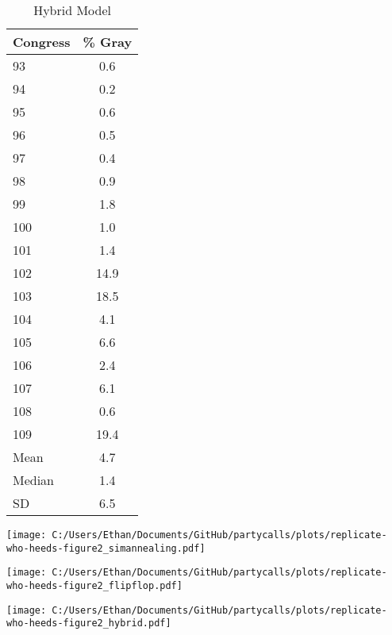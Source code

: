 \documentclass[12pt]{article}
\begin{document}
	\begin{table}[!htbp]
		\begin{center}
			\caption{Hybrid Model}
			\begin{tabular}[!hb]{lc}
				\hline
				Congress &  \% Gray  \\
				\hline
				93 & 0.6 \\ 
				94 & 0.2 \\ 
				95 & 0.6 \\ 
				96 & 0.5 \\ 
			    97 & 0.4 \\ 
				98 & 0.9 \\ 
				99 & 1.8 \\ 
				100 & 1.0 \\ 
				101 & 1.4 \\ 
				102 & 14.9 \\ 
				103 & 18.5 \\ 
				104 & 4.1 \\ 
				105 & 6.6 \\ 
				106 & 2.4 \\ 
				107 & 6.1 \\ 
				108 & 0.6 \\ 
				109 & 19.4 \\ 
				\hline
				Mean & 4.7 \\
				Median & 1.4 \\
				SD & 6.5 \\
				\hline
			\end{tabular}
		\end{center}
	\end{table}
	
	
	
\texttt{[image: C:/Users/Ethan/Documents/GitHub/partycalls/plots/replicate-who-heeds-figure2\_simannealing.pdf]}
	
\texttt{[image: C:/Users/Ethan/Documents/GitHub/partycalls/plots/replicate-who-heeds-figure2\_flipflop.pdf]}
	
\texttt{[image: C:/Users/Ethan/Documents/GitHub/partycalls/plots/replicate-who-heeds-figure2\_hybrid.pdf]}
	
	
	
	
	
	
\end{document}
